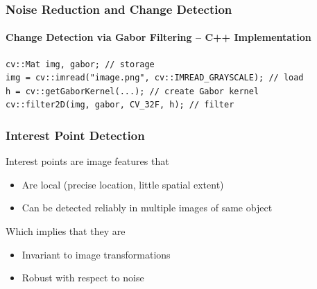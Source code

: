 \documentclass[xetex,professionalfont]{beamer}
\begin{document}

\begin{frame}[fragile]
\frametitle{Noise Reduction and Change Detection}
\framesubtitle{Change Detection via Gabor Filtering -- C++ Implementation}


\begin{verbatim}
cv::Mat img, gabor; // storage
img = cv::imread("image.png", cv::IMREAD_GRAYSCALE); // load
h = cv::getGaborKernel(...); // create Gabor kernel
cv::filter2D(img, gabor, CV_32F, h); // filter

\end{verbatim}

\end{frame}


\begin{frame}
\frametitle{Interest Point Detection}

Interest points are image features that
\begin{itemize}
	\item Are local (precise location, little spatial extent) %
	\item Can be detected reliably in multiple images of same object %
\end{itemize} %

\bigskip
Which implies that they are
\begin{itemize}
	\item Invariant to image transformations
	\item Robust with respect to noise
\end{itemize}

\end{frame}

\end{document}
